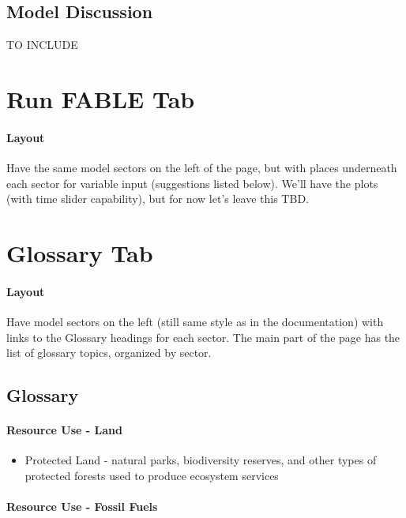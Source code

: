 \documentclass[10pt]{article}
\begin{document}
\subsection{Model Discussion}

TO INCLUDE





\section{Run FABLE Tab}
\paragraph{Layout}
Have the same model sectors on the left of the page, but with places underneath each sector for variable input (suggestions listed below). We'll have the plots (with time slider capability), but for now let's leave this TBD. 



\section{Glossary Tab}
\paragraph{Layout}
Have model sectors on the left (still same style as in the documentation) with links to the Glossary headings for each sector. The main part of the page has the list of glossary topics, organized by sector. 

\subsection{Glossary}
\paragraph{Resource Use - Land}
\begin{itemize}
\item Protected Land - natural parks, biodiversity reserves, and other types of protected forests used to produce ecosystem services
\end{itemize}
\paragraph{Resource Use - Fossil Fuels}
\end{document}

